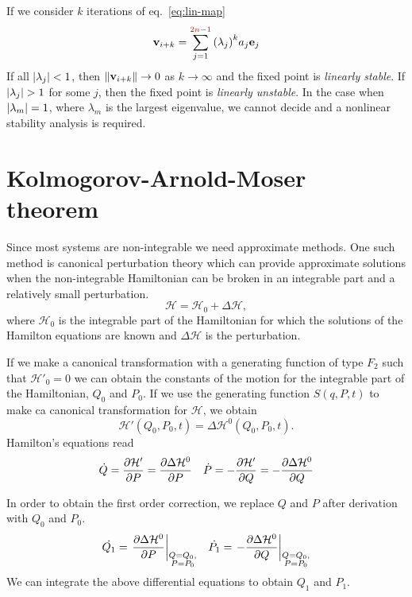 \documentclass[../thesis.tex]{subfiles}
\theoremstyle{plain}
\begin{document}
If we consider \(k\) iterations of eq.~\eqref{eq:lin-map}
\[
  \vb{v}_{i+k} = \sum_{j=1}^{{\color{red}2n-1}} {(\lambda_j)}^k a_j \vb{e}_j
\]
If all \(\abs{\lambda_j} < 1\), then \(\norm{\vb{v}_{i+k}} \to 0\) as \(k\to\infty \)
and the fixed point is \emph{linearly stable}. If \(\abs{\lambda_j} > 1\) for
some \(j\), then the fixed point is \emph{linearly unstable}. In the case when
\(\abs{\lambda_m}=1\), where \(\lambda_m\) is the largest eigenvalue, we cannot
decide and a nonlinear stability analysis is required.


\section{Kolmogorov-Arnold-Moser theorem}

Since most systems are non-integrable we need approximate methods. One such
method is canonical perturbation theory which can provide approximate solutions
when the non-integrable Hamiltonian can be broken in an integrable part and
a relatively small perturbation.
\[
  \mathcal{H} = \mathcal{H}_0 + \Delta \mathcal{H},
\]
where \(\mathcal{H}_0\) is the integrable part of the Hamiltonian for
which the solutions of the Hamilton equations are known and
\(\Delta \mathcal{H}\) is the perturbation.

If we make a canonical transformation with a generating function of type
\(F_2\) such that \(\mathcal{H'}_0 = 0\) we can obtain the constants of the
motion for the integrable part of the Hamiltonian, \(Q_0\) and \(P_0\).
If we use the generating function \(S(q,P,t)\) to make ca canonical transformation
for \(\mathcal{H}\), we obtain
\[
  \mathcal{H'}(Q_0,P_0,t) = \Delta \mathcal{H}^0(Q_0,P_0,t).
\]
Hamilton's equations read
\begin{align*}
  \dot{Q} = \pdv{\mathcal{H'}}{P} = \pdv{\Delta \mathcal{H}^0}{P} &&
  \dot{P} = -\pdv{\mathcal{H'}}{Q} = -\pdv{\Delta \mathcal{H}^0}{Q}
\end{align*}

In order to obtain the first order correction, we replace \(Q\) and \(P\)
after derivation with \(Q_0\) and \(P_0\).
\begin{align*}
  \dot{Q_1} = \eval{\pdv{\Delta \mathcal{H}^0}{P}}_{\substack{Q=Q_0,\\P=P_0}} &&
  \dot{P_1} = \eval{-\pdv{\Delta \mathcal{H}^0}{Q}}_{\substack{Q=Q_0,\\P=P_0}}
\end{align*}
We can integrate the above differential equations to obtain \(Q_1\) and \(P_1\).
\end{document}
